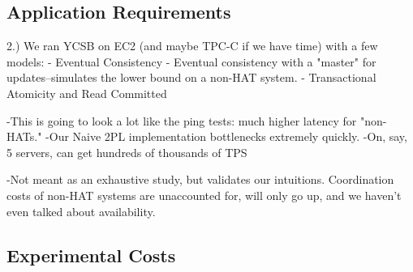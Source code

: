 \subsection{Application Requirements}

2.) We ran YCSB on EC2 (and maybe TPC-C if we have time) with a few models:
	- Eventual Consistency
	- Eventual consistency with a "master" for updates--simulates the lower bound on a non-HAT system.
	- Transactional Atomicity and Read Committed
	
	-This is going to look a lot like the ping tests: much higher latency for "non-HATs."
	-Our Naive 2PL implementation bottlenecks extremely quickly.
	-On, say, 5 servers, can get hundreds of thousands of TPS

	-Not meant as an exhaustive study, but validates our intuitions. Coordination costs of non-HAT systems are unaccounted for, will only go up, and we haven't even talked about availability.

\subsection{Experimental Costs}



